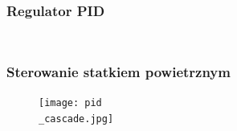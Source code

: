 \documentclass[aspectratio=169]{beamer}
\begin{document}
\begin{frame}%
	\frametitle{Regulator PID}
	\begin{columns}
		\begin{column}{0.5\textwidth}
	   	 	\begin{figure}
	   		 \centering
	    		\end{figure}
		\end{column}
		\begin{column}{0.5\textwidth}
	   	 	\begin{figure}
	   		 \centering
	    		\end{figure}
		\end{column}
	\end{columns}
	
	
\end{frame}

\begin{frame}
	\frametitle{Sterowanie statkiem powietrznym}
	\begin{figure}
	   		 \centering
	      		 \texttt{[image: pid\\\_cascade.jpg]}
	\end{figure}
\end{frame}
\end{document}
